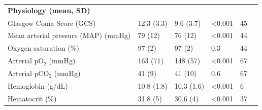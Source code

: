 \documentclass{ws-procs11x85}
\begin{document}
\begin{table}[H]
\begin{adjustbox}{width=1\textwidth}
\begin{tabular}{llllll}
\textbf{Physiology (mean, SD)}               &                                         &                                     &                  &                         &  \\
\hspace{1cm} Glasgow Coma Score (GCS)               & 12.3 (3.3)                              & 9.6 (3.7)                           & \textless 0.001  & 45                      &  \\
\hspace{1cm} Mean arterial pressure (MAP) (mmHg)               & 79 (12)                                 & 76 (12)                             & \textless 0.001  & 44                      &  \\
\hspace{1cm} Oxygen saturation (\%)           & 97 (2)                                  & 97 (2)                              & 0.3              & 44                      &  \\
\hspace{1cm} Arterial pO$_2$ (mmHg)                            & 163 (71)                                & 148 (57)                            & \textless 0.001  & 67                      &  \\
\hspace{1cm} Arterial pCO$_2$ (mmHg)                          & 41 (9)                                  & 41 (10)                             & 0.6              & 67                      &  \\
\hspace{1cm} Hemoglobin (g/dL)                               & 10.8 (1.8)                              & 10.3 (1.6)                          & \textless 0.001  & 6                       & \\
\hspace{1cm} Hematocrit (\%)                               & 31.8 (5)                              & 30.6 (4)                          & \textless 0.001  & 37                       &  \\


\end{tabular}
\end{adjustbox}
\end{table}
\end{document}
